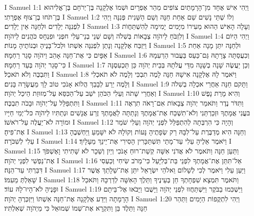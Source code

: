 I Samuel 1:1	וַיְהִי אִישׁ אֶחָד מִן־הָרָמָתַיִם צוֹפִים מֵהַר אֶפְרָיִם וּשְׁמוֹ אֶלְקָנָה בֶּן־יְרֹחָם בֶּן־אֱלִיהוּא בֶּן־תֹּחוּ בֶן־צוּף אֶפְרָתִי׃
I Samuel 1:2	וְלוֹ שְׁתֵּי נָשִׁים שֵׁם אַחַת חַנָּה וְשֵׁם הַשֵּׁנִית פְּנִנָּה וַיְהִי לִפְנִנָּה יְלָדִים וּלְחַנָּה אֵין יְלָדִים׃
I Samuel 1:3	וְעָלָה הָאִישׁ הַהוּא מֵעִירוֹ מִיָּמִים  יָמִימָה לְהִשְׁתַּחֲוֺת וְלִזְבֹּחַ לַיהֹוָה צְבָאוֹת בְּשִׁלֹה וְשָׁם שְׁנֵי בְנֵי־עֵלִי חפְנִי וּפִנְחָס כֹּהֲנִים לַיהֹוָה׃
I Samuel 1:4	וַיְהִי הַיּוֹם וַיִּזְבַּח אֶלְקָנָה וְנָתַן לִפְנִנָּה אִשְׁתּוֹ וּלְכל־בָּנֶיהָ וּבְנוֹתֶיהָ מָנוֹת׃
I Samuel 1:5	וּלְחַנָּה יִתֵּן מָנָה אַחַת אַפָּיִם כִּי אֶת־חַנָּה אָהֵב וַיהֹוָה סָגַר רַחְמָהּ׃
I Samuel 1:6	וְכִעֲסַתָּה צָרָתָהּ גַּם־כַּעַס בַּעֲבוּר הַרְּעִמָהּ כִּי־סָגַר יְהֹוָה בְּעַד רַחְמָהּ׃
I Samuel 1:7	וְכֵן יַעֲשֶׂה שָׁנָה בְשָׁנָה מִדֵּי עֲלֹתָהּ בְּבֵית יְהֹוָה כֵּן תַּכְעִסֶנָּה וַתִּבְכֶּה וְלֹא תֹאכַל׃
I Samuel 1:8	וַיֹּאמֶר לָהּ אֶלְקָנָה אִישָׁהּ חַנָּה לָמֶה תִבְכִּי וְלָמֶה לֹא תֹאכְלִי וְלָמֶה יֵרַע לְבָבֵךְ הֲלוֹא אָנֹכִי טוֹב לָךְ מֵעֲשָׂרָה בָּנִים׃
I Samuel 1:9	וַתָּקם חַנָּה אַחֲרֵי אכְלָה בְשִׁלֹה וְאַחֲרֵי שָׁתֹה וְעֵלִי הַכֹּהֵן יֹשֵׁב עַל־הַכִּסֵּא עַל־מְזוּזַת הֵיכַל יְהֹוָה׃
I Samuel 1:10	וְהִיא מָרַת נָפֶשׁ וַתִּתְפַּלֵּל עַל־יְהֹוָה וּבָכֹה תִבְכֶּה׃
I Samuel 1:11	וַתִּדֹּר נֶדֶר וַתֹּאמַר יְהֹוָה צְבָאוֹת אִם־רָאֹה תִרְאֶה  בּעֳנִי אֲמָתֶךָ וּזְכַרְתַּנִי וְלֹא־תִשְׁכַּח אֶת־אֲמָתֶךָ וְנָתַתָּה לַאֲמָתְךָ זֶרַע אֲנָשִׁים וּנְתַתִּיו לַיהֹוָה כּל־יְמֵי חַיָּיו וּמוֹרָה לֹא־יַעֲלֶה עַל־רֹאשׁוֹ׃
I Samuel 1:12	וְהָיָה כִּי הִרְבְּתָה לְהִתְפַּלֵּל לִפְנֵי יְהֹוָה וְעֵלִי שֹׁמֵר אֶת־פִּיהָ׃
I Samuel 1:13	וְחַנָּה הִיא מְדַבֶּרֶת עַל־לִבָּהּ רַק שְׂפָתֶיהָ נָּעוֹת וְקוֹלָהּ לֹא יִשָּׁמֵעַ וַיַּחְשְׁבֶהָ עֵלִי לְשִׁכֹּרָה׃
I Samuel 1:14	וַיֹּאמֶר אֵלֶיהָ עֵלִי עַד־מָתַי תִּשְׁתַּכָּרִין הָסִירִי אֶת־יֵינֵךְ מֵעָלָיִךְ׃
I Samuel 1:15	וַתַּעַן חַנָּה וַתֹּאמֶר לֹא אֲדֹנִי אִשָּׁה קְשַׁת־רוּחַ אָנֹכִי וְיַיִן וְשֵׁכָר לֹא שָׁתִיתִי וָאֶשְׁפֹּךְ אֶת־נַפְשִׁי לִפְנֵי יְהֹוָה׃
I Samuel 1:16	אַל־תִּתֵּן אֶת־אֲמָתְךָ לִפְנֵי בַּת־בְּלִיָּעַל כִּי־מֵרֹב שִׂיחִי וְכַעְסִי דִּבַּרְתִּי עַד־הֵנָּה׃
I Samuel 1:17	וַיַּעַן עֵלִי וַיֹּאמֶר לְכִי לְשָׁלוֹם וֵאלֹהֵי יִשְׂרָאֵל יִתֵּן אֶת־שֵׁלָתֵךְ אֲשֶׁר שָׁאַלְתְּ מֵעִמּוֹ׃
I Samuel 1:18	וַתֹּאמֶר תִּמְצָא שִׁפְחָתְךָ חֵן בְּעֵינֶיךָ וַתֵּלֶךְ הָאִשָּׁה לְדַרְכָּהּ וַתֹּאכַל וּפָנֶיהָ לֹא־הָיוּ־לָהּ עוֹד׃
I Samuel 1:19	וַיַּשְׁכִּמוּ בַבֹּקֶר וַיִּשְׁתַּחֲווּ לִפְנֵי יְהֹוָה וַיָּשֻׁבוּ וַיָּבֹאוּ אֶל־בֵּיתָם הָרָמָתָה וַיֵּדַע אֶלְקָנָה אֶת־חַנָּה אִשְׁתּוֹ וַיִּזְכְּרֶהָ יְהֹוָה׃
I Samuel 1:20	וַיְהִי לִתְקֻפוֹת הַיָּמִים וַתַּהַר חַנָּה וַתֵּלֶד בֵּן וַתִּקְרָא אֶת־שְׁמוֹ שְׁמוּאֵל כִּי מֵיְהֹוָה שְׁאִלְתִּיו׃
